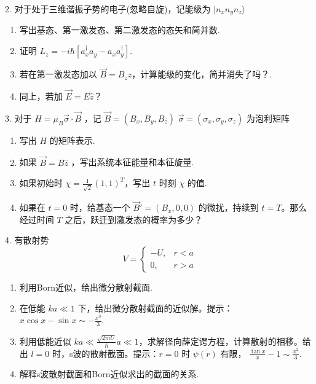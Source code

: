 2. 对于处于三维谐振子势的电子(忽略自旋)，记能级为 $|n_xn_yn_z\rangle$
\begin{enumerate}
    \item 写出基态、第一激发态、第二激发态的态矢和简并数.
    \item 证明 $L_z = -i\hbar[a_x^\dagger a_y - a_x a_y^\dagger]$.
    \item 若在第一激发态加以 $\vec{B} = B_z\hat{z}$，计算能级的变化，简并消失了吗？.
    \item 同上，若加 $\vec{E} = E\hat{z}$？
\end{enumerate}

3. 对于 $H = \mu_B\vec{\sigma} \cdot \vec{B}$ ，记 $\vec{B} = (B_x, B_y, B_z)$ $\vec{\sigma} = (\sigma_x, \sigma_y, \sigma_z)$ 为泡利矩阵
\begin{enumerate}
    \item 写出 $H$ 的矩阵表示.
    \item 如果 $\vec{B} = B\hat{z}$ ，写出系统本征能量和本征旋量.
    \item 如果初始时 $\chi = \frac{1}{\sqrt{2}}(1, 1)^T$，写出 $t$ 时刻 $\chi$ 的值.
    \item 如果在 $t = 0$ 时，给基态一个 $\vec{B}' = (B_x, 0, 0)$ 的微扰，持续到 $t = T$。那么经过时间 $T$ 之后，跃迁到激发态的概率为多少？
\end{enumerate}

4. 有散射势
\begin{equation*}
V = \begin{cases}
-U, & r < a \\
0, & r > a
\end{cases}
\end{equation*}
\begin{enumerate}
    \item[A.] 利用Born近似，给出微分散射截面.
    \item[B.] 在低能 $ka \ll 1$ 下，给出微分散射截面的近似解。提示：
    $x \cos x - \sin x \sim -\frac{x^3}{3}$.
    \item[C.] 利用低能近似 $ka \ll \frac{\sqrt{2mU}}{\hbar}a \ll 1$，求解径向薛定谔方程，计算散射的相移。给出 $l = 0$ 时，s波的散射截面。提示：$r = 0$ 时 $\psi(r)$ 有限，
    $\frac{\tan x}{x} - 1 \sim \frac{x^2}{3}$.
    \item[D.] 解释s波散射截面和Born近似求出的截面的关系.
\end{enumerate}